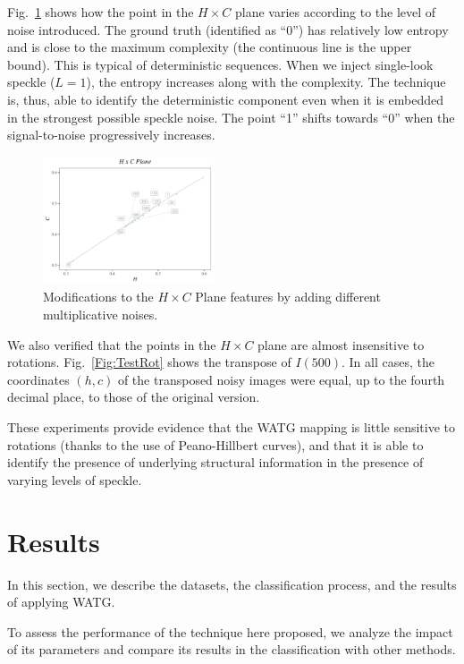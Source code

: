 \documentclass[journal]{IEEEtran}
\begin{document}
	Fig.~\ref{Fig:TestSpeckleHC} shows how the point in the $H\times C$ plane varies according to the level of noise introduced.
	The ground truth (identified as ``\textsf{0}'') has relatively low entropy and is close to the maximum complexity (the continuous line is the upper bound).
	This is typical of deterministic sequences.
	When we inject single-look speckle ($L=1$), the entropy increases along with the complexity.
	The technique is, thus, able to identify the deterministic component even when it is embedded in the strongest possible speckle noise.
	The point ``\textsf{1}'' shifts towards ``\textsf{0}'' when the signal-to-noise progressively increases.
	
	\begin{figure}[hbt]
		\includegraphics[width=0.45\textwidth]{Figures/waves1.pdf}
		\caption{Modifications to the $H \times C$ Plane features by adding different multiplicative noises.}
		\label{Fig:TestSpeckleHC}
	\end{figure}
	
	We also verified that the points in the $H\times C$ plane are almost insensitive to rotations.
	Fig.~\ref{Fig:TestRot} shows the transpose of $I(500)$.
	In all cases, the coordinates $(h,c)$ of the transposed noisy images were equal, up to the fourth decimal place, to those of the original version.
	
	These experiments provide evidence that the WATG mapping is little sensitive to rotations (thanks to the use of Peano-Hillbert curves), and that it is able to identify the presence of underlying structural information in the presence of varying levels of speckle.
	
	\section{Results}\label{Results}
	
	In this section, we describe the datasets, 
	the classification process, and 
	the results of applying WATG.
	
	To assess the performance of the technique here proposed, we analyze the impact of its parameters and compare its results in the classification with other methods.
	
\end{document}
